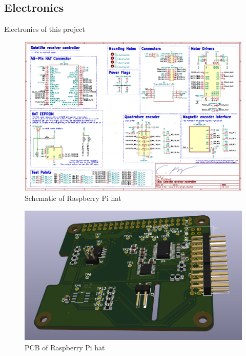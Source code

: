 \subsection{Electronics}

Electronics of this project

\begin{figure}[h]
	\centering
	\includegraphics[width=\linewidth]{../art/pcbSchematic.png}
	\caption{Schematic of Raspberry Pi hat}
\end{figure}


\begin{figure}[h]
	\centering
	\includegraphics[width=\linewidth]{../art/PCB.png}
	\caption{PCB of Raspberry Pi hat}
\end{figure}
